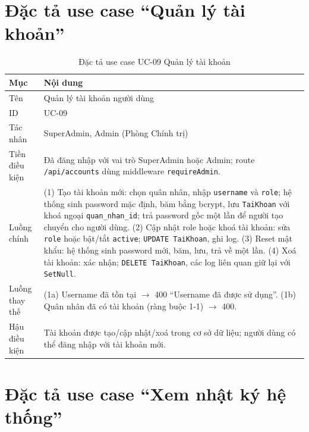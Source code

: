 \documentclass[../DoAn.tex]{subfiles}
\begin{document}
\section{Đặc tả use case ``Quản lý tài khoản''}
\label{appendix:uc09}

\begin{table}[H]
\centering
\caption{Đặc tả use case UC-09 Quản lý tài khoản}
\label{tab:uc09}
\begin{tabular}{|>{\raggedright\arraybackslash}p{3cm}|p{11cm}|}
\hline
\textbf{Mục} & \textbf{Nội dung} \\ \hline
Tên & Quản lý tài khoản người dùng \\ \hline
ID & UC-09 \\ \hline
Tác nhân & SuperAdmin, Admin (Phòng Chính trị) \\ \hline
Tiền điều kiện & Đã đăng nhập với vai trò SuperAdmin hoặc Admin; route \texttt{/api/accounts} dùng middleware \texttt{requireAdmin}. \\ \hline
Luồng chính &
(1) Tạo tài khoản mới: chọn quân nhân, nhập \texttt{username} và \texttt{role}; hệ thống sinh password mặc định, băm bằng bcrypt, lưu \texttt{TaiKhoan} với khoá ngoại \texttt{quan\_nhan\_id}; trả password gốc một lần để người tạo chuyển cho người dùng. (2) Cập nhật role hoặc khoá tài khoản: sửa \texttt{role} hoặc bật/tắt \texttt{active}; \texttt{UPDATE TaiKhoan}, ghi log. (3) Reset mật khẩu: hệ thống sinh password mới, băm, lưu, trả về một lần. (4) Xoá tài khoản: xác nhận; \texttt{DELETE TaiKhoan}, các log liên quan giữ lại với \texttt{SetNull}. \\ \hline
Luồng thay thế &
(1a) Username đã tồn tại $\rightarrow$ 400 ``Username đã được sử dụng''. (1b) Quân nhân đã có tài khoản (ràng buộc 1-1) $\rightarrow$ 400. \\ \hline
Hậu điều kiện & Tài khoản được tạo/cập nhật/xoá trong cơ sở dữ liệu; người dùng có thể đăng nhập với tài khoản mới. \\ \hline
\end{tabular}
\end{table}

\section{Đặc tả use case ``Xem nhật ký hệ thống''}
\label{appendix:uc10}
\end{document}
